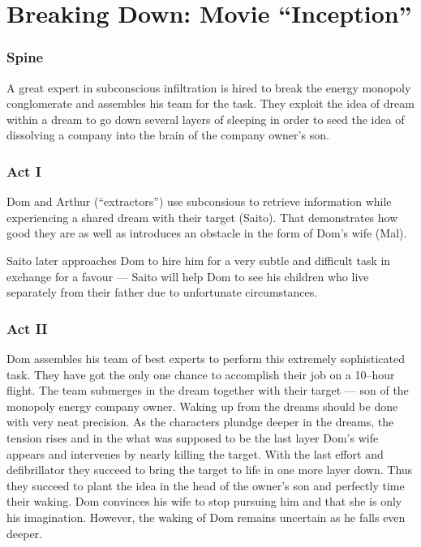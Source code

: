 \documentclass{article}
\begin{document}
\section*{Breaking Down: Movie ``Inception''}

\subsubsection*{Spine}

A great expert in subconscious infiltration is hired to break the energy
monopoly conglomerate and assembles his team for the task. They exploit the idea
of dream within a dream to go down several layers of sleeping in order to seed
the idea of dissolving a company into the brain of the company owner's son.

\subsubsection*{Act I}

Dom and Arthur (``extractors'') use subconsious to retrieve information while
experiencing a shared dream with their target (Saito). That demonstrates how
good they are as well as introduces an obstacle in the form of Dom's wife (Mal).

Saito later approaches Dom to hire him for a very subtle and difficult task in
exchange for a favour --- Saito will help Dom to see his children who live
separately from their father due to unfortunate circumstances.

\subsubsection*{Act II}

Dom assembles his team of best experts to perform this extremely sophisticated
task. They have got the only one chance to accomplish their job on a 10--hour
flight. The team submerges in the dream together with their target --- son of
the monopoly energy company owner. Waking up from the dreams should be done with
very neat precision. As the characters plundge deeper in the dreams, the tension
rises and in the what was supposed to be the last layer Dom's wife appears and
intervenes by nearly killing the target. With the last effort and defibrillator
they succeed to bring the target to life in one more layer down. Thus they
succeed to plant the idea in the head of the owner's son and perfectly time
their waking. Dom convinces his wife to stop pursuing him and that she is only
his imagination. However, the waking of Dom remains uncertain as he falls even
deeper.
\end{document}
